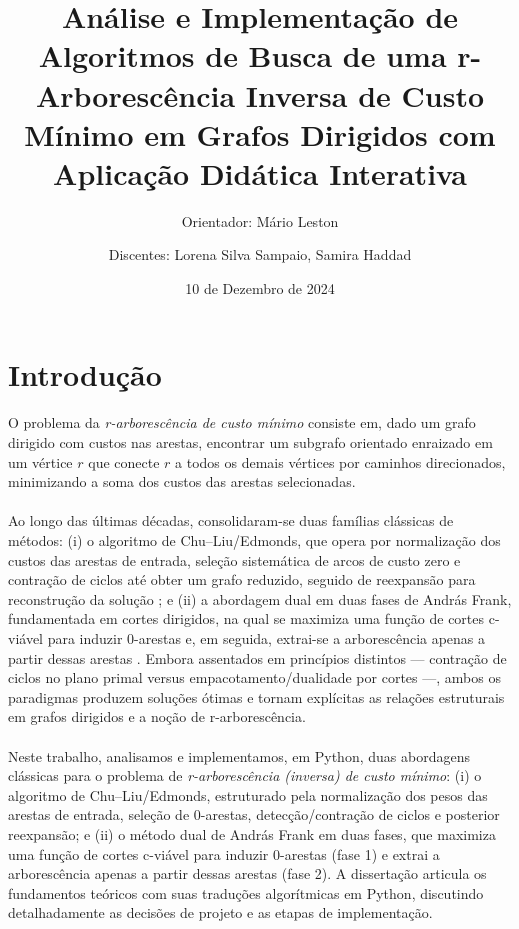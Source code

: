 \documentclass[12pt,a4paper]{article}
\title{Análise e Implementação de Algoritmos de Busca de uma r-Arborescência Inversa de Custo Mínimo em Grafos Dirigidos com Aplicação Didática Interativa}
\author{Orientador: Mário Leston 
\and Discentes: Lorena Silva Sampaio, Samira Haddad}
\date{10 de Dezembro de 2024}
\begin{document}
\maketitle

\section{Introdução}

\paragraph{}
O problema da \textit{r-arborescência de custo mínimo} consiste em, dado um grafo dirigido com custos nas arestas, encontrar um subgrafo orientado enraizado em um vértice \(r\) que conecte \(r\) a todos os demais vértices por caminhos direcionados, minimizando a soma dos custos das arestas selecionadas.  

\paragraph{}
Ao longo das últimas décadas, consolidaram-se duas famílias clássicas de métodos: (i) o algoritmo de Chu--Liu/Edmonds, que opera por normalização dos custos das arestas de entrada, seleção sistemática de arcos de custo zero e contração de ciclos até obter um grafo reduzido, seguido de reexpansão para reconstrução da solução \cite{chu1965,edmonds1967optimum}; e (ii) a abordagem dual em duas fases de András Frank, fundamentada em cortes dirigidos, na qual se maximiza uma função de cortes c-viável para induzir 0-arestas e, em seguida, extrai-se a arborescência apenas a partir dessas arestas \cite{frank2014}. Embora assentados em princípios distintos — contração de ciclos no plano primal versus empacotamento/dualidade por cortes —, ambos os paradigmas produzem soluções ótimas e tornam explícitas as relações estruturais em grafos dirigidos e a noção de r-arborescência.  

\paragraph{}
Neste trabalho, analisamos e implementamos, em Python, duas abordagens clássicas para o problema de \textit{r-arborescência (inversa) de custo mínimo}: (i) o algoritmo de Chu--Liu/Edmonds, estruturado pela normalização dos pesos das arestas de entrada, seleção de 0-arestas, detecção/contração de ciclos e posterior reexpansão; e (ii) o método dual de András Frank em duas fases, que maximiza uma função de cortes c-viável para induzir 0-arestas (fase 1) e extrai a arborescência apenas a partir dessas arestas (fase 2). A dissertação articula os fundamentos teóricos com suas traduções algorítmicas em Python, discutindo detalhadamente as decisões de projeto e as etapas de implementação.
\end{document}

